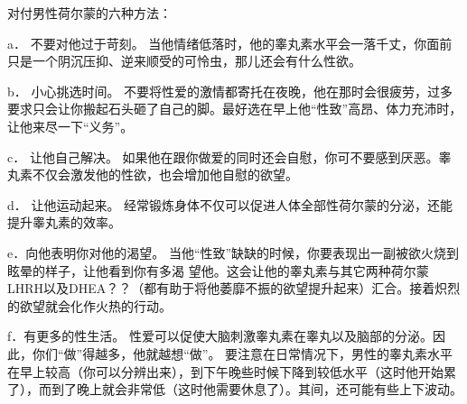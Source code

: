 \documentclass[12pt,UTF8,openany]{ctexbook}
\begin{document}
对付男性荷尔蒙的六种方法：

a． 不要对他过于苛刻。
当他情绪低落时，他的睾丸素水平会一落千丈，你面前只是一个阴沉压抑、逆来顺受的可怜虫，那儿还会有什么性欲。

b． 小心挑选时间。
不要将性爱的激情都寄托在夜晚，他在那时会很疲劳，过多要求只会让你搬起石头砸了自己的脚。最好选在早上他“性致”高昂、体力充沛时，让他来尽一下“义务”。

c． 让他自己解决。
如果他在跟你做爱的同时还会自慰，你可不要感到厌恶。睾丸素不仅会激发他的性欲，也会增加他自慰的欲望。

d． 让他运动起来。
经常锻炼身体不仅可以促进人体全部性荷尔蒙的分泌，还能提升睾丸素的效率。

e．向他表明你对他的渴望。
当他“性致”缺缺的时候，你要表现出一副被欲火烧到眩晕的样子，让他看到你有多渴 望他。这会让他的睾丸素与其它两种荷尔蒙LHRH以及DHEA？？（都有助于将他萎靡不振的欲望提升起来）汇合。接着炽烈的欲望就会化作火热的行动。

f．有更多的性生活。
性爱可以促使大脑刺激睾丸素在睾丸以及脑部的分泌。因此，你们“做”得越多，他就越想“做”。
要注意在日常情况下，男性的睾丸素水平在早上较高（你可以分辨出来），到下午晚些时候下降到较低水平（这时他开始累了），而到了晚上就会非常低（这时他需要休息了）。其间，还可能有些上下波动。
\end{document}
